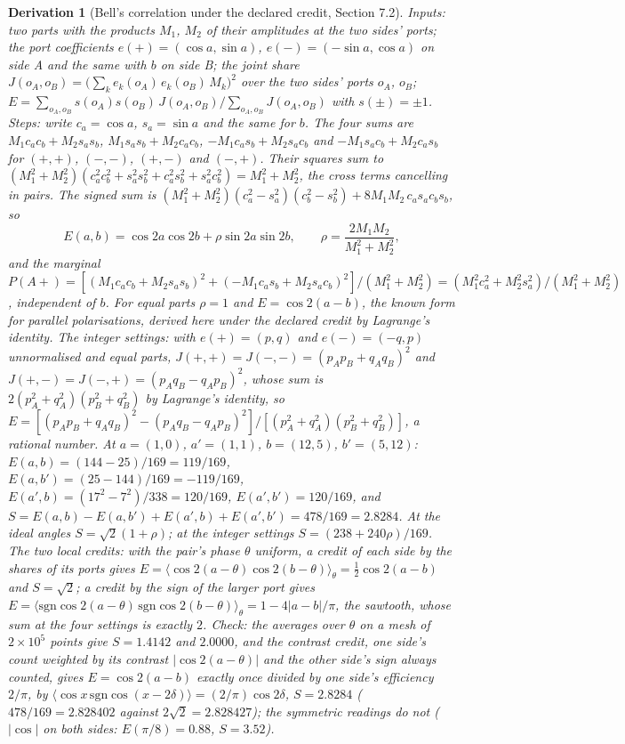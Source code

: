 \documentclass[pdflatex,sn-mathphys-num]{sn-jnl}
\theoremstyle{thmstyleone}
\newtheorem{derivation}{Derivation}
\begin{document}
\begin{derivation}[Bell's correlation under the declared credit, Section 7.2]
\emph{Inputs:} two parts with the products $M_1$, $M_2$ of their amplitudes at the two sides' ports; the port coefficients $e(+) = (\cos a, \sin a)$, $e(-) = (-\sin a, \cos a)$ on side A and the same with $b$ on side B; the joint share $J(o_A, o_B) = \bigl(\sum_k e_k(o_A)\,e_k(o_B)\,M_k\bigr)^2$ over the two sides' ports $o_A$, $o_B$; $E = \sum_{o_A, o_B} s(o_A)s(o_B)\,J(o_A, o_B) / \sum_{o_A, o_B} J(o_A, o_B)$ with $s(\pm) = \pm 1$. \emph{Steps:} write $c_a = \cos a$, $s_a = \sin a$ and the same for $b$. The four sums are $M_1 c_a c_b + M_2 s_a s_b$, $M_1 s_a s_b + M_2 c_a c_b$, $-M_1 c_a s_b + M_2 s_a c_b$ and $-M_1 s_a c_b + M_2 c_a s_b$ for $(+, +)$, $(-, -)$, $(+, -)$ and $(-, +)$. Their squares sum to $(M_1^2 + M_2^2)(c_a^2 c_b^2 + s_a^2 s_b^2 + c_a^2 s_b^2 + s_a^2 c_b^2) = M_1^2 + M_2^2$, the cross terms cancelling in pairs. The signed sum is $(M_1^2 + M_2^2)(c_a^2 - s_a^2)(c_b^2 - s_b^2) + 8M_1M_2\,c_a s_a c_b s_b$, so
\[
E(a, b) = \cos 2a\cos 2b + \rho\sin 2a\sin 2b, \qquad \rho = \frac{2M_1M_2}{M_1^2 + M_2^2},
\]
and the marginal $P(A+) = [(M_1 c_a c_b + M_2 s_a s_b)^2 + (-M_1 c_a s_b + M_2 s_a c_b)^2] / (M_1^2 + M_2^2) = (M_1^2 c_a^2 + M_2^2 s_a^2) / (M_1^2 + M_2^2)$, independent of $b$. For equal parts $\rho = 1$ and $E = \cos 2(a - b)$, the known form for parallel polarisations, derived here under the declared credit by Lagrange's identity. \emph{The integer settings:} with $e(+) = (p, q)$ and $e(-) = (-q, p)$ unnormalised and equal parts, $J(+, +) = J(-, -) = (p_Ap_B + q_Aq_B)^2$ and $J(+, -) = J(-, +) = (p_Aq_B - q_Ap_B)^2$, whose sum is $2(p_A^2 + q_A^2)(p_B^2 + q_B^2)$ by Lagrange's identity, so $E = [(p_Ap_B + q_Aq_B)^2 - (p_Aq_B - q_Ap_B)^2] / [(p_A^2 + q_A^2)(p_B^2 + q_B^2)]$, a rational number. At $a = (1, 0)$, $a' = (1, 1)$, $b = (12, 5)$, $b' = (5, 12)$: $E(a, b) = (144 - 25) / 169 = 119 / 169$, $E(a, b') = (25 - 144) / 169 = -119 / 169$, $E(a', b) = (17^2 - 7^2) / 338 = 120 / 169$, $E(a', b') = 120 / 169$, and $S = E(a, b) - E(a, b') + E(a', b) + E(a', b') = 478 / 169 = 2.8284$. At the ideal angles $S = \sqrt 2(1 + \rho)$; at the integer settings $S = (238 + 240\rho) / 169$. \emph{The two local credits:} with the pair's phase $\theta$ uniform, a credit of each side by the shares of its ports gives $E = \langle\cos 2(a - \theta)\cos 2(b - \theta)\rangle_\theta = \frac{1}{2}\cos 2(a - b)$ and $S = \sqrt 2$; a credit by the sign of the larger port gives $E = \langle\mathrm{sgn}\cos 2(a - \theta)\,\mathrm{sgn}\cos 2(b - \theta)\rangle_\theta = 1 - 4|a - b| / \pi$, the sawtooth, whose sum at the four settings is exactly $2$. \emph{Check:} the averages over $\theta$ on a mesh of $2 \times 10^5$ points give $S = 1.4142$ and $2.0000$, and the contrast credit, one side's count weighted by its contrast $|\cos 2(a - \theta)|$ and the other side's sign always counted, gives $E = \cos 2(a - b)$ exactly once divided by one side's efficiency $2 / \pi$, by $\langle\cos x\,\mathrm{sgn}\cos(x - 2\delta)\rangle = (2 / \pi)\cos 2\delta$, $S = 2.8284$ ($478 / 169 = 2.828402$ against $2\sqrt 2 = 2.828427$); the symmetric readings do not ($|\cos|$ on both sides: $E(\pi / 8) = 0.88$, $S = 3.52$).

\end{derivation}
\end{document}
